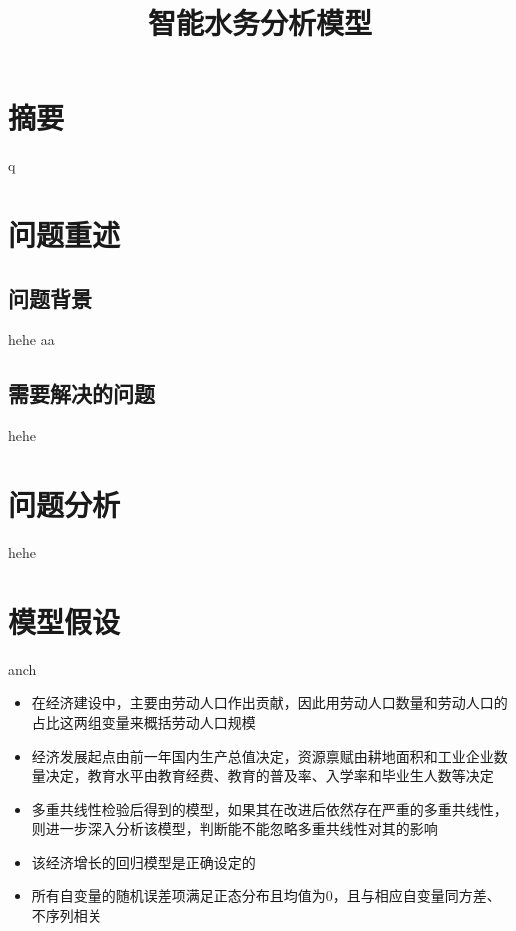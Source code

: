 \documentclass{article}
\begin{document}
	\title{\vspace{+10pt} \heiti \textbf {智能水务分析模型}}
	\songti
	\author{}
	\date{}
	\maketitle  
	\section*{\centering \textbf{摘要}}
	q \cite{NBS}
	\newpage
	\section{问题重述}
		\subsection{问题背景}
		hehe \cite{kaldor1957model}
		aa\cite{ywf2017eduandeco}
	
		\subsection{需要解决的问题}
		hehe \cite[text]{sqf}
	\section{问题分析}	
	hehe
	\section{模型假设}
	anch
	\begin{itemize}
		\item 在经济建设中，主要由劳动人口作出贡献，因此用劳动人口数量和劳动人口的占比这两组变量来概括劳动人口规模
		\item 经济发展起点由前一年国内生产总值决定，资源禀赋由耕地面积和工业企业数量决定，教育水平由教育经费、教育的普及率、入学率和毕业生人数等决定
		\item 多重共线性检验后得到的模型，如果其在改进后依然存在严重的多重共线性，则进一步深入分析该模型，判断能不能忽略多重共线性对其的影响
		\item 该经济增长的回归模型是正确设定的
		\item 所有自变量的随机误差项满足正态分布且均值为0，且与相应自变量同方差、不序列相关
	\end{itemize}
\end{document}
